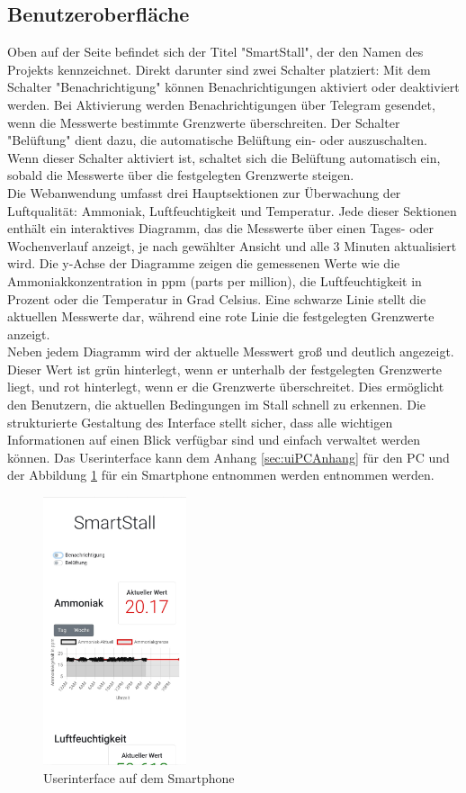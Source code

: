 \documentclass[conference]{IEEEtran}
\begin{document}
\subsection{Benutzeroberfläche}
\label{ui}
Oben auf der Seite befindet sich der Titel "SmartStall", der den Namen des Projekts kennzeichnet. Direkt darunter sind zwei Schalter platziert: Mit dem Schalter "Benachrichtigung" können Benachrichtigungen aktiviert oder deaktiviert werden. Bei Aktivierung werden Benachrichtigungen über Telegram gesendet, wenn die Messwerte bestimmte Grenzwerte überschreiten. Der Schalter "Belüftung" dient dazu, die automatische Belüftung ein- oder auszuschalten. Wenn dieser Schalter aktiviert ist, schaltet sich die Belüftung automatisch ein, sobald die Messwerte über die festgelegten Grenzwerte steigen. \\
Die Webanwendung umfasst drei Hauptsektionen zur Überwachung der Luftqualität: Ammoniak, Luftfeuchtigkeit und Temperatur. Jede dieser Sektionen enthält ein interaktives Diagramm, das die Messwerte über einen Tages- oder Wochenverlauf anzeigt, je nach gewählter Ansicht und alle 3 Minuten aktualisiert wird. Die y-Achse der Diagramme zeigen die gemessenen Werte wie die Ammoniakkonzentration in ppm (parts per million), die Luftfeuchtigkeit in Prozent oder die Temperatur in Grad Celsius. Eine schwarze Linie stellt die aktuellen Messwerte dar, während eine rote Linie die festgelegten Grenzwerte anzeigt. \\
Neben jedem Diagramm wird der aktuelle Messwert groß und deutlich angezeigt. Dieser Wert ist grün hinterlegt, wenn er unterhalb der festgelegten Grenzwerte liegt, und rot hinterlegt, wenn er die Grenzwerte überschreitet. Dies ermöglicht den Benutzern, die aktuellen Bedingungen im Stall schnell zu erkennen. Die strukturierte Gestaltung des Interface stellt sicher, dass alle wichtigen Informationen auf einen Blick verfügbar sind und einfach verwaltet werden können. Das Userinterface kann dem Anhang \ref{sec:uiPCAnhang} für den PC und der Abbildung \ref{uiHandy} für ein Smartphone entnommen werden entnommen werden. 
\begin{figure}[h]
	\centering
	\includegraphics[width=42mm]{fig/uiHandy.jpg}
	\caption{Userinterface auf dem Smartphone}
	\label{uiHandy}
\end{figure}
\end{document}
